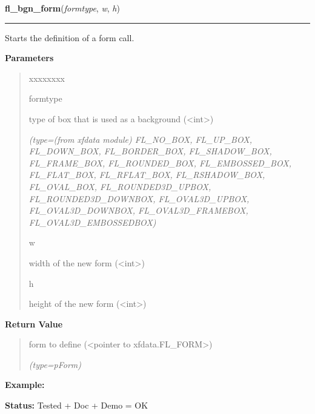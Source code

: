 \hspace{.8\funcindent}\begin{boxedminipage}{\funcwidth}

    \raggedright \textbf{fl\_bgn\_form}(\textit{formtype}, \textit{w}, \textit{h})

    \vspace{-1.5ex}

    \rule{\textwidth}{0.5\fboxrule}
\setlength{\parskip}{2ex}
    Starts the definition of a form call.

\setlength{\parskip}{1ex}
      \textbf{Parameters}
      \vspace{-1ex}

      \begin{quote}
        \begin{Ventry}{xxxxxxxx}

          \item[formtype]

          type of box that is used as a background 
          ({\textless}int{\textgreater})

            {\it (type=(from xfdata module) FL\_NO\_BOX, FL\_UP\_BOX, FL\_DOWN\_BOX, 
FL\_BORDER\_BOX, FL\_SHADOW\_BOX, FL\_FRAME\_BOX, FL\_ROUNDED\_BOX, 
FL\_EMBOSSED\_BOX, FL\_FLAT\_BOX, FL\_RFLAT\_BOX, FL\_RSHADOW\_BOX, 
FL\_OVAL\_BOX, FL\_ROUNDED3D\_UPBOX, FL\_ROUNDED3D\_DOWNBOX, 
FL\_OVAL3D\_UPBOX, FL\_OVAL3D\_DOWNBOX, FL\_OVAL3D\_FRAMEBOX, 
FL\_OVAL3D\_EMBOSSEDBOX)}

          \item[w]

          width of the new form ({\textless}int{\textgreater})

          \item[h]

          height of the new form ({\textless}int{\textgreater})

        \end{Ventry}

      \end{quote}

      \textbf{Return Value}
    \vspace{-1ex}

      \begin{quote}
      form to define ({\textless}pointer to xfdata.FL\_FORM{\textgreater})

      {\it (type=pForm)}

      \end{quote}

\textbf{Example:} 

\textbf{Status:} Tested + Doc + Demo = OK



    \end{boxedminipage}

